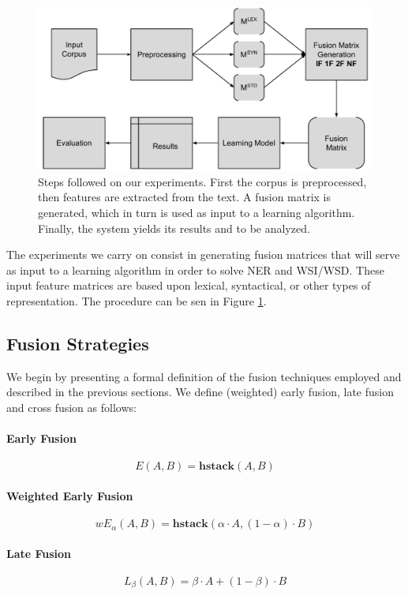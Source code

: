 \documentclass{llncs}
\begin{document}
\begin{figure}[t]
\centering
\caption{Steps followed on our experiments. First the corpus is preprocessed, then features are extracted from the text. A fusion matrix is generated, which in turn is used as input to a learning algorithm. Finally, the system yields its results and to be analyzed.}
\includegraphics[width=0.85\linewidth]{img/diag_metodo}

\label{fig:diagmetodo}
\end{figure}

The experiments we carry on consist in generating fusion matrices that will serve as input to a learning algorithm in order to solve NER and WSI/WSD. These input feature matrices are based upon lexical, syntactical, or other types of representation. The procedure can be sen in Figure \ref{fig:diagmetodo}.

\subsection{Fusion Strategies}
We begin by presenting a  formal definition of the fusion techniques employed and described in the previous sections. We define (weighted) early fusion, late fusion and cross fusion as follows:
\paragraph{Early Fusion}
\begin{equation}
E(A,B) = \mathbf{hstack}(A , B)
\end{equation}
\paragraph{Weighted Early Fusion}
\begin{equation}
wE_\alpha(A,B) = \mathbf{hstack}(\alpha\cdot A , (1-\alpha)\cdot B)
\end{equation}
\paragraph{Late Fusion}
\begin{equation} \label{eq:late-fusion}
L_\beta(A,B) = \beta \cdot A + (1 - \beta)\cdot B
\end{equation}
\end{document}

